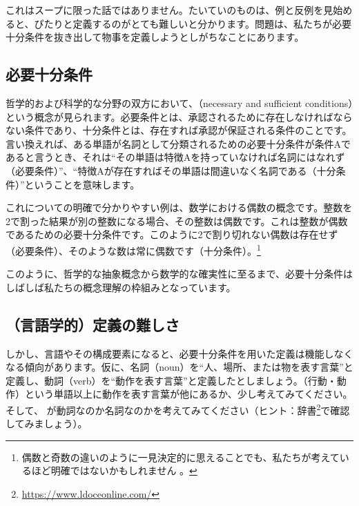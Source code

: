 これはスープに限った話ではありません。たいていのものは、例と反例を見始めると、ぴたりと定義するのがとても難しいと分かります。問題は、私たちが必要十分条件を抜き出して物事を定義しようとしがちなことにあります。

\subsection{必要十分条件}\label{sec:conditions}

哲学的および科学的な分野の双方において、（necessary and sufficient conditions）という概念が見られます。必要条件とは、承認されるために存在しなければならない条件であり、十分条件とは、存在すれば承認が保証される条件のことです。言い換えれば、ある単語が名詞として分類されるための必要十分条件が条件Aであると言うとき、それは\enquote{その単語は特徴Aを持っていなければ名詞にはなれず（必要条件）}、\enquote{特徴Aが存在すればその単語は間違いなく名詞である（十分条件）}ということを意味します。

これについての明確で分かりやすい例は、数学における偶数の概念です。整数を2で割った結果が別の整数になる場合、その整数は偶数です。これは整数が偶数であるための必要十分条件です。このように2で割り切れない偶数は存在せず（必要条件）、そのような数は常に偶数です（十分条件）。\footnote{偶数と奇数の違いのように一見決定的に思えることでも、私たちが考えているほど明確ではないかもしれません \autocite{Heubner2018}。}

このように、哲学的な抽象概念から数学的な確実性に至るまで、必要十分条件はしばしば私たちの概念理解の枠組みとなっています。

\subsection{（言語学的）定義の難しさ}\label{sec:definitions}

しかし、言語やその構成要素になると、必要十分条件を用いた定義は機能しなくなる傾向があります。仮に、名詞（noun）を\enquote{人、場所、または物を表す言葉}と定義し、動詞（verb）を\enquote{動作を表す言葉}と定義したとしましょう。（行動・動作）という単語以上に動作を表す言葉が他にあるか、少し考えてみてください。そして、 が動詞なのか名詞なのかを考えてみてください（ヒント：辞書\footnote{\url{https://www.ldoceonline.com/}}で確認してみましょう）。

